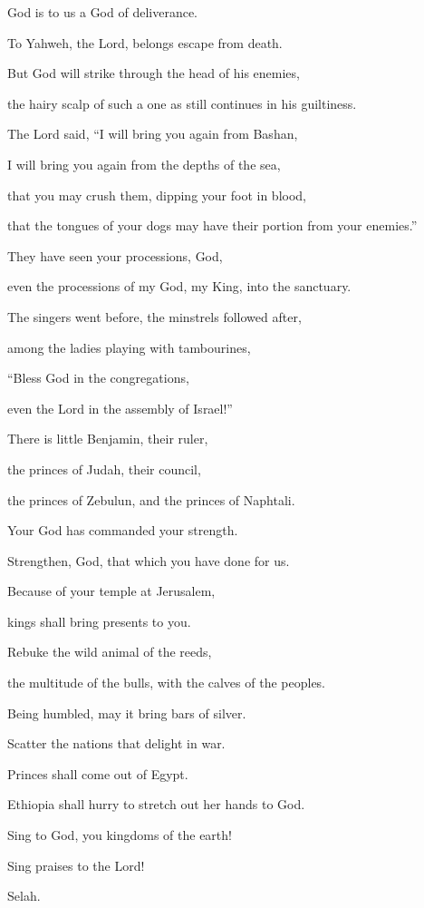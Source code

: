 {\Q {}God is to us a God of deliverance.
\par }{\QB To Yahweh, the Lord, belongs escape from death.
\par }{\Q {}But God will strike through the head of his enemies,
\par }{\QB the hairy scalp of such a one as still continues in his guiltiness.
\par }{\Q {}The Lord said, “I will bring you again from Bashan,
\par }{\QB I will bring you again from the depths of the sea,
\par }{\Q {}that you may crush them, dipping your foot in blood,
\par }{\QB that the tongues of your dogs may have their portion from your enemies.”
\par }{\Q {}They have seen your processions, God,
\par }{\QB even the processions of my God, my King, into the sanctuary.
\par }{\Q {}The singers went before, the minstrels followed after,
\par }{\QB among the ladies playing with tambourines,
\par }{\Q {}“Bless God in the congregations,
\par }{\QB even the Lord in the assembly of Israel!”
\par }{\Q {}There is little Benjamin, their ruler,
\par }{\QB the princes of Judah, their council,
\par }{\QB the princes of Zebulun, and the princes of Naphtali.
\par }{\BB \par }{\Q {}Your God has commanded your strength.
\par }{\QB Strengthen, God, that which you have done for us.
\par }{\Q {}Because of your temple at Jerusalem,
\par }{\QB kings shall bring presents to you.
\par }{\Q {}Rebuke the wild animal of the reeds,
\par }{\QB the multitude of the bulls, with the calves of the peoples.
\par }{\Q Being humbled, may it bring bars of silver.
\par }{\QB Scatter the nations that delight in war.
\par }{\Q {}Princes shall come out of Egypt.
\par }{\QB Ethiopia shall hurry to stretch out her hands to God.
\par }{\Q {}Sing to God, you kingdoms of the earth!
\par }{\QB Sing praises to the Lord!
\par }{\QS Selah.\par }
